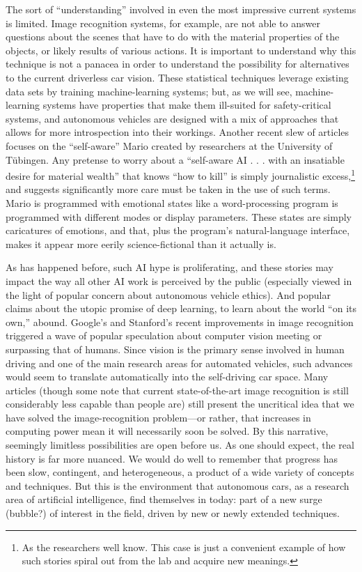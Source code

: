 The sort of ``understanding''
involved in even the most impressive current systems is limited. Image
recognition systems, for example, are not
able to answer questions about the scenes that have to do with
the material properties of the objects, or likely results of various
actions.\cite{gomesJordan} It is important to understand why this technique is not a
panacea in order to understand the possibility for alternatives to the current
driverless car vision. These statistical techniques leverage existing data
sets by training machine-learning systems; but, as we will see,
machine-learning systems have properties that make them ill-suited for
safety-critical systems, and autonomous vehicles are designed with a
mix of approaches that allows for more introspection into their
workings. Another recent slew of articles focuses on
the ``self-aware'' Mario created by researchers at the University of
T\"{u}bingen. Any pretense to worry about a ``self-aware AI . . . with
an insatiable desire for material wealth'' that knows ``how to kill''\cite{vincentMario}
is simply journalistic excess,\footnote{As the
  researchers well know. This case is just a convenient example of how
such stories spiral out from the lab and acquire new meanings.} and suggests
significantly more care must be taken in the use of such terms. Mario
is programmed with emotional states like a word-processing program is
programmed with different modes or display parameters. These states
are simply caricatures of emotions, and that, plus the program's
natural-language interface, makes it appear more eerily science-fictional than it
actually is.

As has happened before, such AI hype is proliferating, and these
stories may impact the way all other AI work is
perceived by the public (especially viewed in the light of
popular concern about autonomous vehicle ethics). And popular claims
about the utopic promise of deep learning, to
learn about the world ``on its own,''
abound. Google's and Stanford's recent
improvements in image recognition\cite{markoffImage} triggered a wave
of popular speculation about computer vision meeting or surpassing
that of humans. Since vision is the primary sense involved in human driving
and one of the main research areas for automated vehicles, such
advances would seem to translate automatically into the self-driving
car space. Many articles (though some note that current
state-of-the-art image recognition is still considerably less capable
than people are) still present the uncritical idea that we have solved
the image-recognition problem---or rather, that increases in computing
power mean it will necessarily soon be solved. By this narrative, seemingly limitless
possibilities are open before us. As one should expect, the real
history is far more nuanced. We would do well to remember that
progress has been slow, contingent, and heterogeneous, a product of a
wide variety of concepts and techniques. But
this is the environment that autonomous cars, as a
research area of artificial intelligence, find themselves in today:
part of a new surge (bubble?) of interest in the field, driven by new
or newly extended techniques. 


